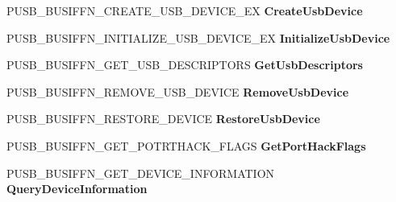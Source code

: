\begin{DoxyCompactItemize}
P\+U\+S\+B\+\_\+\+B\+U\+S\+I\+F\+F\+N\+\_\+\+C\+R\+E\+A\+T\+E\+\_\+\+U\+S\+B\+\_\+\+D\+E\+V\+I\+C\+E\+\_\+\+EX {\bfseries Create\+Usb\+Device}
\item 
\mbox{\label{struct___u_s_b___b_u_s___i_n_t_e_r_f_a_c_e___h_u_b___v7_a4ed4fc0ba9e97accbb51360471bc35d5}} 
P\+U\+S\+B\+\_\+\+B\+U\+S\+I\+F\+F\+N\+\_\+\+I\+N\+I\+T\+I\+A\+L\+I\+Z\+E\+\_\+\+U\+S\+B\+\_\+\+D\+E\+V\+I\+C\+E\+\_\+\+EX {\bfseries Initialize\+Usb\+Device}
\item 
\mbox{\label{struct___u_s_b___b_u_s___i_n_t_e_r_f_a_c_e___h_u_b___v7_a7d869474176a94ec0d9afb85317dcdff}} 
P\+U\+S\+B\+\_\+\+B\+U\+S\+I\+F\+F\+N\+\_\+\+G\+E\+T\+\_\+\+U\+S\+B\+\_\+\+D\+E\+S\+C\+R\+I\+P\+T\+O\+RS {\bfseries Get\+Usb\+Descriptors}
\item 
\mbox{\label{struct___u_s_b___b_u_s___i_n_t_e_r_f_a_c_e___h_u_b___v7_aa32b33fa08e4d604b1dd6152f045cebc}} 
P\+U\+S\+B\+\_\+\+B\+U\+S\+I\+F\+F\+N\+\_\+\+R\+E\+M\+O\+V\+E\+\_\+\+U\+S\+B\+\_\+\+D\+E\+V\+I\+CE {\bfseries Remove\+Usb\+Device}
\item 
\mbox{\label{struct___u_s_b___b_u_s___i_n_t_e_r_f_a_c_e___h_u_b___v7_a428fbe579bfa880d9db4ff226b8a60aa}} 
P\+U\+S\+B\+\_\+\+B\+U\+S\+I\+F\+F\+N\+\_\+\+R\+E\+S\+T\+O\+R\+E\+\_\+\+D\+E\+V\+I\+CE {\bfseries Restore\+Usb\+Device}
\item 
\mbox{\label{struct___u_s_b___b_u_s___i_n_t_e_r_f_a_c_e___h_u_b___v7_a91c56db60e298bbadf994551b3b1ba79}} 
P\+U\+S\+B\+\_\+\+B\+U\+S\+I\+F\+F\+N\+\_\+\+G\+E\+T\+\_\+\+P\+O\+T\+R\+T\+H\+A\+C\+K\+\_\+\+F\+L\+A\+GS {\bfseries Get\+Port\+Hack\+Flags}
\item 
\mbox{\label{struct___u_s_b___b_u_s___i_n_t_e_r_f_a_c_e___h_u_b___v7_a832039d963d6944b1c42d486ea6a1665}} 
P\+U\+S\+B\+\_\+\+B\+U\+S\+I\+F\+F\+N\+\_\+\+G\+E\+T\+\_\+\+D\+E\+V\+I\+C\+E\+\_\+\+I\+N\+F\+O\+R\+M\+A\+T\+I\+ON {\bfseries Query\+Device\+Information}
\item 
\mbox{\label{struct___u_s_b___b_u_s___i_n_t_e_r_f_a_c_e___h_u_b___v7_ae09ad95430c33a0da2b373fa4f582b43}} 

\end{DoxyCompactItemize}
